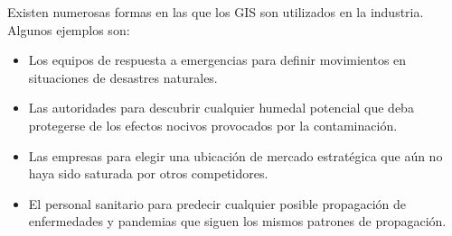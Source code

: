 Existen numerosas formas en las que los GIS son utilizados en la industria. Algunos ejemplos son:

\begin{itemize}
  \item Los equipos de respuesta a emergencias para definir movimientos en situaciones de desastres naturales.
  \item Las autoridades para descubrir cualquier humedal potencial que deba protegerse de los efectos nocivos provocados por la contaminación.
  \item Las empresas para elegir una ubicación de mercado estratégica que aún no haya sido saturada por otros competidores.
  \item El personal sanitario para predecir cualquier posible propagación de enfermedades y pandemias que siguen los mismos patrones de propagación.
\end{itemize}